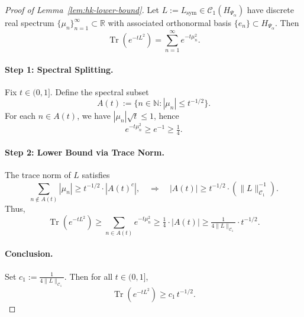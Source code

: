 \begin{proof}[Proof of Lemma~\ref{lem:hk-lower-bound}]
Let \( L := L_{\mathrm{sym}} \in \mathcal{C}_1(H_{\Psi_\alpha}) \) have discrete real spectrum \( \{ \mu_n \}_{n=1}^\infty \subset \mathbb{R} \) with associated orthonormal basis \( \{ e_n \} \subset H_{\Psi_\alpha} \). Then
\[
\operatorname{Tr}(e^{-t L^2}) = \sum_{n=1}^\infty e^{-t \mu_n^2}.
\]

\paragraph{Step 1: Spectral Splitting.}
Fix \( t \in (0,1] \). Define the spectral subset
\[
A(t) := \{ n \in \mathbb{N} : |\mu_n| \le t^{-1/2} \}.
\]
For each \( n \in A(t) \), we have \( |\mu_n| \sqrt{t} \le 1 \), hence
\[
e^{-t \mu_n^2} \ge e^{-1} \ge \tfrac{1}{4}.
\]

\paragraph{Step 2: Lower Bound via Trace Norm.}
The trace norm of \( L \) satisfies
\[
\sum_{n \notin A(t)} |\mu_n| \ge t^{-1/2} \cdot |A(t)^c|,
\quad \Rightarrow \quad |A(t)| \ge t^{-1/2} \cdot \left( \|L\|_{\mathcal{C}_1}^{-1} \right).
\]
Thus,
\[
\operatorname{Tr}(e^{-t L^2}) \ge \sum_{n \in A(t)} e^{-t \mu_n^2}
\ge \tfrac{1}{4} \cdot |A(t)| \ge \tfrac{1}{4 \|L\|_{\mathcal{C}_1}} \cdot t^{-1/2}.
\]

\paragraph{Conclusion.}
Set \( c_1 := \tfrac{1}{4 \|L\|_{\mathcal{C}_1}} \). Then for all \( t \in (0,1] \),
\[
\operatorname{Tr}(e^{-t L^2}) \ge c_1 \, t^{-1/2}.
\]
\end{proof}
